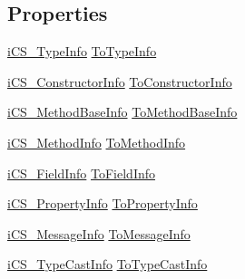 \subsection*{Properties}
\begin{DoxyCompactItemize}
\item 
\hyperlink{classi_c_s___type_info}{i\+C\+S\+\_\+\+Type\+Info} \hyperlink{classi_c_s___member_info_a9b41e3b58ed350484d184c7a07fd9680}{To\+Type\+Info}
\item 
\hyperlink{classi_c_s___constructor_info}{i\+C\+S\+\_\+\+Constructor\+Info} \hyperlink{classi_c_s___member_info_a4f8ebf73aaa1bbf9a81715b23e16f6a6}{To\+Constructor\+Info}
\item 
\hyperlink{classi_c_s___method_base_info}{i\+C\+S\+\_\+\+Method\+Base\+Info} \hyperlink{classi_c_s___member_info_a8288f48e27bbf418a96ed4b563ef0d1b}{To\+Method\+Base\+Info}
\item 
\hyperlink{classi_c_s___method_info}{i\+C\+S\+\_\+\+Method\+Info} \hyperlink{classi_c_s___member_info_a3dcd2f21b17a9970c166c98329387c48}{To\+Method\+Info}
\item 
\hyperlink{classi_c_s___field_info}{i\+C\+S\+\_\+\+Field\+Info} \hyperlink{classi_c_s___member_info_a956a9b3d8972c59e0cc8aedf1660ebbc}{To\+Field\+Info}
\item 
\hyperlink{classi_c_s___property_info}{i\+C\+S\+\_\+\+Property\+Info} \hyperlink{classi_c_s___member_info_ada8245542dfb5912ae138755e8eaab12}{To\+Property\+Info}
\item 
\hyperlink{classi_c_s___message_info}{i\+C\+S\+\_\+\+Message\+Info} \hyperlink{classi_c_s___member_info_a65febe6accf08a8d8d47a2a520f22d21}{To\+Message\+Info}
\item 
\hyperlink{classi_c_s___type_cast_info}{i\+C\+S\+\_\+\+Type\+Cast\+Info} \hyperlink{classi_c_s___member_info_a160165641d5a1b5ca504d70bf66baa04}{To\+Type\+Cast\+Info}
\item 

\end{DoxyCompactItemize}
